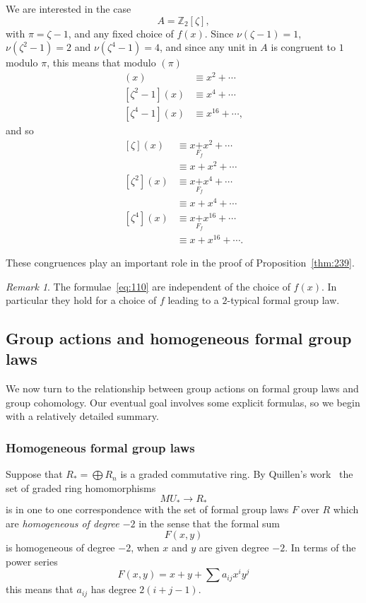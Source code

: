 \documentclass{amsart}
\newtheorem{rem}[equation]{Remark}
\theoremstyle{definition}
\theoremstyle{remark}
\newtheorem{rem}[equation]{Remark}
\newcommand{\Z}{{\mathbb Z}}
\newcommand{\mustar}{MU_{\ast}}
\newcommand{\ltgroup}{F_{f}}
\begin{document}
We are interested in the case
\[
A=\Z_{2}[\zeta],
\]
with $\pi = \zeta-1$, and any fixed choice of $f(x)$.  Since
$\nu(\zeta-1) = 1$, $\nu(\zeta^{2}-1) = 2$ and $\nu(\zeta^{4}-1)=4$,
and since any unit in $A$ is congruent to $1$ modulo $\pi$, this means
that modulo $(\pi)$
\begin{align*}
[\zeta-1](x) &\equiv x^{2} +\cdots \\
[\zeta^{2}-1](x) &\equiv x^{4} +\cdots \\
[\zeta^{4}-1](x) &\equiv x^{16} +\cdots, 
\end{align*}
and so 
\begin{equation}
\label{eq:110}
\begin{aligned}{}
[\zeta](x) &\equiv x \underset{\ltgroup}{+} x^{2} +\cdots \\
& \equiv x + x^{2} +\cdots \\
[\zeta^{2}](x) &\equiv x \underset{\ltgroup}{+} x^{4} +\cdots \\
& \equiv x + x^{4} +\cdots \\
[\zeta^{4}](x) &\equiv x \underset{\ltgroup}{+} x^{16} +\cdots  \\
&\equiv x + x^{16} +\cdots.
\end{aligned}
\end{equation}

These congruences play an important role in the proof of
Proposition~\ref{thm:239}.

\begin{rem}
\label{rem:60} The formulae~\eqref{eq:110} are independent of the
choice of $f(x)$.  In particular they hold for a choice of $f$ leading
to a $2$-typical formal group law.
\end{rem}


\subsection{Group actions and homogeneous formal group laws}
\label{sec:group-acti-homog} 
We now turn to the relationship between
group actions on formal group laws and group cohomology.  Our eventual
goal involves some explicit formulas, so we begin with a relatively
detailed summary.

\subsubsection{Homogeneous formal group laws}
\label{sec:homog-form-group}

Suppose that $R_{\ast}=\bigoplus R_{n}$ is a graded commutative ring.
By Quillen's work~\cite{Qui:FGL,Ad:SHGH} the set of graded ring
homomorphisms
\[
\mustar \to R_{\ast}
\]
is in one to one correspondence with the set of formal group laws $F$
over $R$ which are {\em homogeneous of degree $-2$} in the sense that the
formal sum
\[
F(x,y)
\]
is homogeneous of degree $-2$, when $x$ and $y$ are given degree
$-2$.    In terms of the power series 
\[
F(x,y) = x + y + \sum a_{ij}x^{i}y^{j}
\]
this means that $a_{ij}$ has degree $2(i+j-1)$.   
\end{document}
